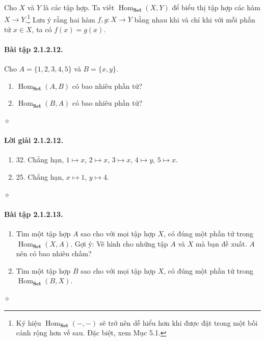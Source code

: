 Cho $X$ và $Y$ là các tập hợp. Ta viết $\operatorname{Hom}_{\mathbf{Set}}(X,Y)$ để biểu thị tập hợp các hàm $X\to Y$.\footnote{Ký hiệu $\operatorname{Hom}_{\mathbf{Set}}(-,-)$ sẽ trở nên dễ hiểu hơn khi được đặt trong một bối cảnh rộng hơn về sau. Đặc biệt, xem Mục 5.1.} Lưu ý rằng hai hàm $f,g:X\to Y$ bằng nhau khi và chỉ khi với mỗi phần tử $x\in X$, ta có $f(x)=g(x)$.
\paragraph{Bài tập 2.1.2.12.} Cho $A=\{1,2,3,4,5\}$ và $B=\{x,y\}$.
\begin{enumerate}[label=\alph*.]\item $\operatorname{Hom}_{\mathbf{Set}}(A,B)$ có bao nhiêu phần tử?\item $\operatorname{Hom}_{\mathbf{Set}}(B,A)$ có bao nhiêu phần tử?\end{enumerate}\hfill$\diamond$
\paragraph{Lời giải 2.1.2.12.}
\begin{enumerate}[label=\alph*.]\item 32. Chẳng hạn, $1\mapsto x$, $2\mapsto x$, $3\mapsto x$, $4\mapsto y$, $5\mapsto x$.\item 25. Chẳng hạn, $x\mapsto1$, $y\mapsto4$.\end{enumerate}\hfill$\diamond$
\paragraph{Bài tập 2.1.2.13.}
\begin{enumerate}[label=\alph*.]
\item Tìm một tập hợp $A$ sao cho với mọi tập hợp $X$, có đúng một phần tử trong $\operatorname{Hom}_{\mathbf{Set}}(X,A)$. Gợi ý: Vẽ hình cho những tập $A$ và $X$ mà bạn đề xuất. $A$ nên có bao nhiêu chấm?
\item Tìm một tập hợp $B$ sao cho với mọi tập hợp $X$, có đúng một phần tử trong $\operatorname{Hom}_{\mathbf{Set}}(B,X)$.
\end{enumerate}\hfill$\diamond$
